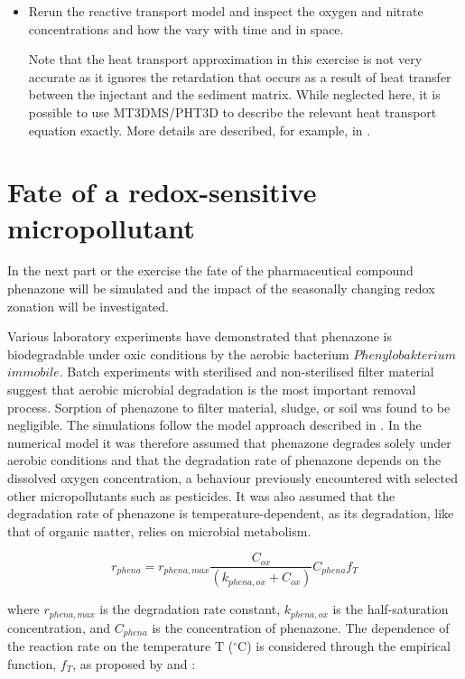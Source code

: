 \begin{itemize}
\item Rerun the reactive transport model and inspect 
the oxygen and nitrate concentrations and how the vary with time and in space.

Note that the heat transport approximation in this exercise is not very accurate
as it ignores the retardation that occurs as a result of heat transfer between
the injectant and the sediment matrix. 
While neglected here, it is possible to use MT3DMS/PHT3D to describe 
the relevant heat transport equation exactly. 
More details are described, for example, in \cite{seibert_2014}.   

\end{itemize}

\section[Fate of a redox-sensitive micropollutant]{Fate of a redox-sensitive micropollutant}

In the next part or the exercise the fate of the pharmaceutical compound 
phenazone will be simulated and the impact of the seasonally 
changing redox zonation will be investigated. 

Various laboratory experiments
have demonstrated that phenazone is biodegradable under
oxic conditions \citep{phdzuelke} by the aerobic 
bacterium $Phenylobakterium$ $immobile$. 
Batch experiments with sterilised
and non-sterilised filter material suggest that aerobic microbial
degradation is the most important removal process.
Sorption of phenazone to filter material, sludge, or soil was
found to be negligible. 
The simulations follow the model approach described in \cite{greskowiak_2006}. 
In the numerical model it was
therefore assumed that phenazone degrades solely under
aerobic conditions and that the degradation rate of
phenazone depends on the dissolved oxygen concentration, a behaviour
previously encountered with selected other micropollutants such as 
pesticides. It was also assumed that the degradation
rate of phenazone is temperature-dependent, as its degradation,
like that of organic matter, relies on microbial metabolism.

\begin{equation}
{r_{phena} = r_{phena,max} {\frac{C_{ox}}{(k_{phena,ox} + C_{ox})}} C_{phena} f_T }
\label{eq:phenazone_deg}
\end{equation}

where $r_{phena,max}$ is the degradation rate constant,
$k_{phena,ox}$ is the half-saturation concentration, 
and $C_{phena}$ is the concentration of phenazone. 
The dependence  of the reaction rate 
on the temperature T ($^{\circ}$C) is considered through 
the empirical function, $f_T$, as proposed by \cite{oconnel_1990} 
and \cite{kirschbaum_1995}:

